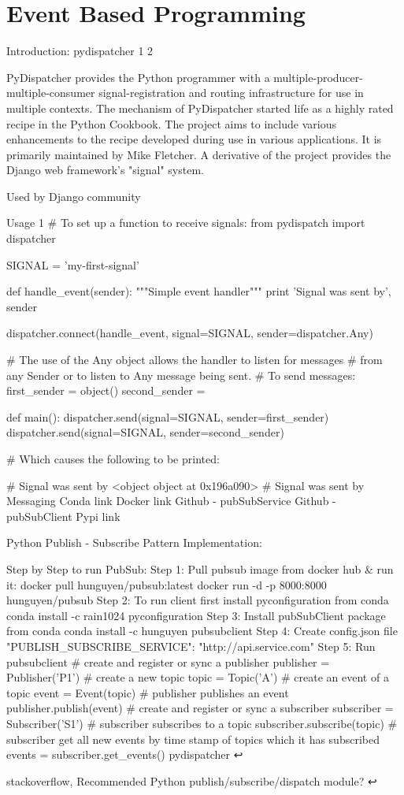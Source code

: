 \section{Event Based Programming}

Introduction: pydispatcher 1 2

PyDispatcher provides the Python programmer with a multiple-producer-multiple-consumer signal-registration and routing infrastructure for use in multiple contexts. The mechanism of PyDispatcher started life as a highly rated recipe in the Python Cookbook. The project aims to include various enhancements to the recipe developed during use in various applications. It is primarily maintained by Mike Fletcher. A derivative of the project provides the Django web framework's "signal" system.

Used by Django community

Usage 1
# To set up a function to receive signals:
from pydispatch import dispatcher

SIGNAL = 'my-first-signal'


def handle_event(sender):
    """Simple event handler"""
    print 'Signal was sent by', sender


dispatcher.connect(handle_event, signal=SIGNAL, sender=dispatcher.Any)

# The use of the Any object allows the handler to listen for messages
# from any Sender or to listen to Any message being sent.
# To send messages:
first_sender = object()
second_sender = {}


def main():
    dispatcher.send(signal=SIGNAL, sender=first_sender)
    dispatcher.send(signal=SIGNAL, sender=second_sender)

    # Which causes the following to be printed:

    # Signal was sent by <object object at 0x196a090>
    # Signal was sent by {}
Messaging
Conda link Docker link Github - pubSubService Github - pubSubClient Pypi link

Python Publish - Subscribe Pattern Implementation:

Step by Step to run PubSub:
Step 1: Pull pubsub image from docker hub & run it:
docker pull hunguyen/pubsub:latest
docker run -d -p 8000:8000 hunguyen/pubsub
Step 2: To run client first install pyconfiguration from conda
conda install -c rain1024 pyconfiguration
Step 3: Install pubSubClient package from conda
conda install -c hunguyen pubsubclient
Step 4: Create config.json file
{
  "PUBLISH_SUBSCRIBE_SERVICE": "http://api.service.com"
}
Step 5: Run pubsubclient
# create and register or sync a publisher
publisher = Publisher('P1')
# create a new topic
topic = Topic('A')
# create an event of a topic
event = Event(topic)
# publisher publishes an event
publisher.publish(event)
# create and register or sync a subscriber
subscriber = Subscriber('S1')
# subscriber subscribes to a topic
subscriber.subscribe(topic)
# subscriber get all new events by time stamp of topics which it has subscribed
events = subscriber.get_events()
pydispatcher ↩

stackoverflow, Recommended Python publish/subscribe/dispatch module? ↩